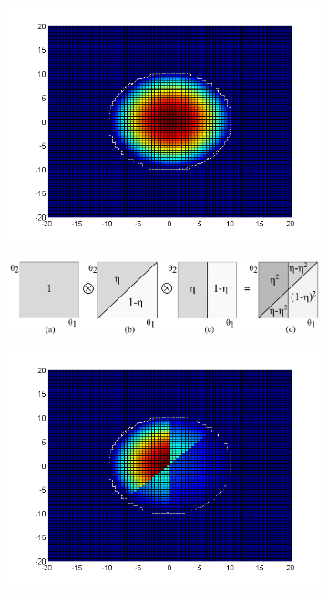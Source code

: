 \begin{figure}%
\centering
\begin{subfigure}{.2\textwidth}
  \centering
  \includegraphics[width=.99\textwidth]{pic/bpplPriorART.png}
  \label{fig:prior2d}
\end{subfigure}%
\begin{subfigure}{.58\textwidth}
\centering
\includegraphics[width=.99\textwidth]{pic/running1.pdf}
\end{subfigure}
\begin{subfigure}{.2\textwidth}
  \centering
  \includegraphics[width=.99\textwidth]{pic/bpplPosteriorIII.png}

\end{subfigure}
\end{figure}
